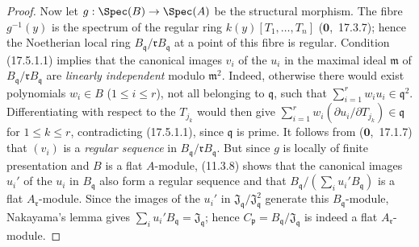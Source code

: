 \begin{proof}
Now let $g:\Spec(B)\to\Spec(A)$ be the structural morphism.
The fibre $g^{-1}(y)$ is the spectrum of the regular ring $k(y)[T_1,\ldots,T_n]$ ($\mathbf{0}$,~17.3.7); hence the Noetherian local ring $B_\mathfrak{q}/\mathfrak{r}B_\mathfrak{q}$ at a point of this fibre is regular.
Condition (17.5.1.1) implies that the canonical images $v_i$ of the $u_i$ in the maximal ideal $\mathfrak{m}$ of $B_\mathfrak{q}/\mathfrak{r}B_\mathfrak{q}$ are \emph{linearly independent} modulo $\mathfrak{m}^2$.
Indeed, otherwise there would exist polynomials $w_i\in B$ ($1\leqslant i\leqslant r$), not all belonging to $\mathfrak{q}$, such that $\sum_{i=1}^r w_i u_i\in\mathfrak{q}^2$.
Differentiating with respect to the $T_{j_k}$ would then give $\sum_{i=1}^r w_i(\partial u_i/\partial T_{j_k})\in\mathfrak{q}$ for $1\leqslant k\leqslant r$, contradicting (17.5.1.1), since $\mathfrak{q}$ is prime.
It follows from ($\mathbf{0}$,~17.1.7) that $(v_i)$ is a \emph{regular sequence} in $B_\mathfrak{q}/\mathfrak{r}B_\mathfrak{q}$.
But since $g$ is locally of finite presentation and $B$ is a flat $A$-module, (11.3.8) shows that the canonical images $u_i'$ of the $u_i$ in $B_\mathfrak{q}$ also form a regular sequence and that $B_\mathfrak{q}/(\sum_i u_i'B_\mathfrak{q})$ is a flat $A_\mathfrak{r}$-module.
Since the images of the $u_i'$ in $\mathfrak{J}_\mathfrak{q}/\mathfrak{J}_\mathfrak{q}^2$ generate this $B_\mathfrak{q}$-module, Nakayama's lemma gives $\sum_i u_i'B_\mathfrak{q}=\mathfrak{J}_\mathfrak{q}$; hence $C_\mathfrak{p}=B_\mathfrak{q}/\mathfrak{J}_\mathfrak{q}$ is indeed a flat $A_\mathfrak{r}$-module.


\end{proof}
